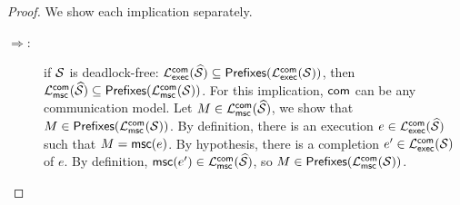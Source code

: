 
\begin{proof}
    We show each implication separately.
    \begin{description}
        \item[$\Rightarrow$:]
        if $\mathcal{S}$ is deadlock-free: $\mathcal{L}_{\mathsf{exec}}^{\mathsf{com}}(\widehat{\mathcal{S}})\subseteq\mathsf{Prefixes}(\mathcal{L}_{\mathsf{exec}}^{\mathsf{com}}(\mathcal{S}))$, 
        then 
        $\mathcal{L}_{\mathsf{msc}}^{\mathsf{com}}(\widehat{\mathcal{S}})\subseteq
        \mathsf{Prefixes}(\mathcal{L}_{\mathsf{msc}}^{\mathsf{com}}(\mathcal{S}))$.
        For this implication, $\mathsf{com}$ can be any communication model.
        Let $M\in\mathcal{L}_{\mathsf{msc}}^{\mathsf{com}}(\widehat{\mathcal{S}})$, 
       we show that $M\in\mathsf{Prefixes}(\mathcal{L}_{\mathsf{msc}}^{\mathsf{com}}(\mathcal{S}))$.
        By definition, there is an execution $e\in\mathcal{L}_{\mathsf{exec}}^{\mathsf{com}}(\widehat{\mathcal{S}})$ such that $M=\mathsf{msc}(e)$.
        By hypothesis, there is a completion $e' \in\mathcal{L}_{\mathsf{exec}}^{\mathsf{com}}(\mathcal{S})$ of $e$.
        By definition, $\mathsf{msc}(e')\in\mathcal{L}_{\mathsf{msc}}^{\mathsf{com}}(\widehat{\mathcal{S}})$,
        so $M\in\mathsf{Prefixes}(\mathcal{L}_{\mathsf{msc}}^{\mathsf{com}}(\mathcal{S}))$.


\end{description}
\end{proof}

